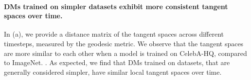 \paragraph{DMs trained on simpler datasets exhibit more consistent tangent spaces over time.} 
\label{sec:evolution-t}


In  (a), we provide a distance matrix of the tangent spaces across different timesteps, measured by the geodesic metric. 
We observe that the tangent spaces are more similar to each other when a model is trained on CelebA-HQ, compared to ImageNet.
.
As expected, we find that DMs trained on datasets, that are generally considered simpler, have similar local tangent spaces over time.

